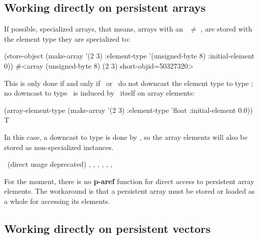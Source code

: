 \subsection[Persistent arrays]{Working directly on persistent arrays}

If possible, specialized arrays, that means, arrays with an
\ $\neq$ , are stored with the element
type they are specialized to:
\begin{CompactCode}
\listener{}(store-object (make-array '(2 3)
                                       :element-type '(unsigned-byte 8)
                                       :initial-element 0))
#<array (unsigned-byte 8) (2 3) short-objid=50327320>
\end{CompactCode}

This is only done if and only if \lwcl\ or \allegrocl\ do not
downcast the element type to type ; no downcast to type
\ is induced by \plob\ itself on array elements:
\begin{CompactCode}
\listener{}(array-element-type (make-array '(2 3)
                                             :element-type 'float
                                             :initial-element 0.0))
T
\end{CompactCode}

In this case, a downcast to type  is done by \allegrocl, so
the array elements will also be stored as non-specialized instances.

\begin{NarrowRefList}
\Allocator {}
\TypePredicate {}
\ObjectStore {}
\ObjectLoad {}
\SlotAccessor {}\ (direct usage
  deprecated)
\Information {},
  , ,
  , ,
  , 
\end{NarrowRefList}
For the moment, there is no \textbf{p-aref} function for direct access
to persistent array elements. The workaround is that a persistent
array must be stored or loaded as a whole for accessing its
elements.

\subsection[Persistent vectors]{Working directly on persistent
  vectors}

